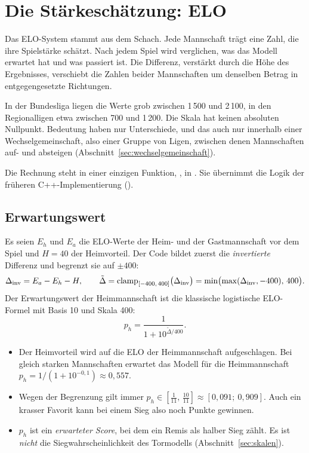 \chapter{Die Stärkeschätzung: ELO}\label{kap:elo}

Das ELO-System stammt aus dem Schach. Jede Mannschaft trägt eine Zahl, die
ihre Spielstärke schätzt. Nach jedem Spiel wird verglichen, was das Modell
erwartet hat und was passiert ist. Die Differenz, verstärkt durch die Höhe
des Ergebnisses, verschiebt die Zahlen beider Mannschaften um denselben
Betrag in entgegengesetzte Richtungen.

In der Bundesliga liegen die Werte grob zwischen 1\,500 und 2\,100, in den
Regionalligen etwa zwischen 700 und 1\,200. Die Skala hat keinen absoluten
Nullpunkt. Bedeutung haben nur Unterschiede, und das auch nur innerhalb einer
Wechselgemeinschaft, also einer Gruppe von Ligen, zwischen denen Mannschaften
auf- und absteigen (Abschnitt~\ref{sec:wechselgemeinschaft}).

Die Rechnung steht in einer einzigen Funktion,
, in
. Sie übernimmt die Logik
der früheren C++-Implementierung ().

\section{Erwartungswert}

Es seien $E_h$ und $E_a$ die ELO-Werte der Heim- und der Gastmannschaft
vor dem Spiel und $H = 40$ der Heimvorteil. Der Code bildet zuerst die
\emph{invertierte} Differenz und begrenzt sie auf $\pm 400$:
\begin{equation}
  \Delta_{\text{inv}} = E_a - E_h - H, \qquad
  \tilde\Delta = \operatorname{clamp}_{[-400,\,400]}\bigl(\Delta_{\text{inv}}\bigr)
              = \min\bigl(\max(\Delta_{\text{inv}}, -400),\, 400\bigr).
\end{equation}
Der Erwartungswert der Heimmannschaft ist die klassische logistische
ELO-Formel mit Basis 10 und Skala 400:
\begin{equation}\label{eq:elo-erwartung}
  p_h = \frac{1}{1 + 10^{\tilde\Delta/400}}.
\end{equation}

\begin{itemize}
  \item Der Heimvorteil wird auf die ELO der Heimmannschaft aufgeschlagen.
        Bei gleich starken Mannschaften erwartet das Modell für die
        Heimmannschaft $p_h = 1/(1+10^{-0{,}1}) \approx 0{,}557$.
  \item Wegen der Begrenzung gilt immer
        $p_h \in [\tfrac{1}{11},\, \tfrac{10}{11}] \approx [0{,}091;\ 0{,}909]$.
        Auch ein krasser Favorit kann bei einem Sieg also noch Punkte gewinnen.
  \item $p_h$ ist ein \emph{erwarteter Score}, bei dem ein Remis als halber
        Sieg zählt. Es ist \emph{nicht} die Siegwahrscheinlichkeit des
        Tormodells (Abschnitt~\ref{sec:skalen}).
\end{itemize}


